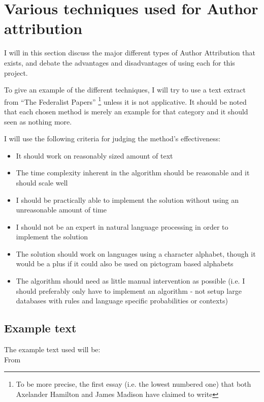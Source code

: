 \section{Various techniques used for Author attribution}
\label{choiceMethod}
I will in this section discuss the major different types of Author Attribution that exists, and debate the advantages and disadvantages of using each for this project.

To give an example of the different techniques, I will try to use a text extract from ``The Federalist Papers'' \cite{federalist} \footnote{To be more precise, the first essay (i.e. the lowest numbered one) that both Axelander Hamilton and James Madison have claimed to write} unless it is not applicative. It should be noted that each chosen method is merely an example for that category and it should seen as nothing more.

I will use the following criteria for judging the method's effectiveness:
\begin{itemize}
\item It should work on reasonably sized amount of text
\item The time complexity inherent in the algorithm should be reasonable and it should scale well
\item I should be practically able to implement the solution without using an unreasonable amount of time
\item I should not be an expert in natural language processing in order to implement the solution
\item The solution should work on languages using a character alphabet, though it would be a plus if it could also be used on pictogram based alphabets
\item The algorithm should need as little manual intervention as possible (i.e. I should preferably only have to implement an algorithm - not setup large databases with rules and language specific probabilities or contexts)  
\end{itemize}

\subsection*{Example text}
The example text used will be:\\
From \cite{federalist}

